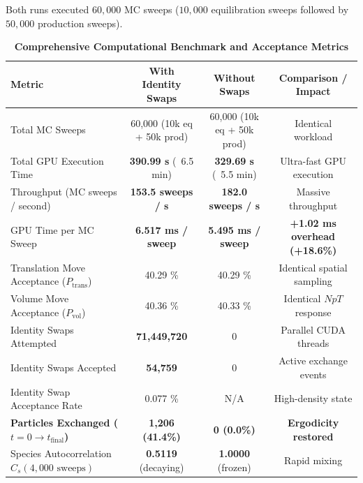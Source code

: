 \documentclass[11pt,a4paper]{article}
\begin{document}
Both runs executed $60,000$ MC sweeps ($10,000$ equilibration sweeps followed by $50,000$ production sweeps).

\begin{table}[htbp]
\centering
\small
\caption{\textbf{Comprehensive Computational Benchmark and Acceptance Metrics}}
\label{tab:benchmark_metrics}
\vspace{0.5em}
\begin{tabular*}{\textwidth}{@{\extracolsep{\fill}}lccc@{}}
\toprule
\textbf{Metric} & \textbf{With Identity Swaps} & \textbf{Without Swaps} & \textbf{Comparison / Impact} \\
\midrule
Total MC Sweeps                      & 60,000 (10k eq + 50k prod)  & 60,000 (10k eq + 50k prod)  & Identical workload \\
Total GPU Execution Time             & \textbf{390.99 s} (~6.5 min) & \textbf{329.69 s} (~5.5 min) & Ultra-fast GPU execution \\
Throughput (MC sweeps / second)      & \textbf{153.5 sweeps / s}   & \textbf{182.0 sweeps / s}   & Massive throughput \\
GPU Time per MC Sweep                & \textbf{6.517 ms / sweep}   & \textbf{5.495 ms / sweep}   & \textbf{+1.02 ms overhead (+18.6\%)} \\
Translation Move Acceptance ($P_{\text{trans}}$) & 40.29 \%        & 40.29 \%                    & Identical spatial sampling \\
Volume Move Acceptance ($P_{\text{vol}}$)        & 40.36 \%        & 40.33 \%                    & Identical $NpT$ response \\
Identity Swaps Attempted             & \textbf{71,449,720}         & 0                           & Parallel CUDA threads \\
Identity Swaps Accepted              & \textbf{54,759}             & 0                           & Active exchange events \\
Identity Swap Acceptance Rate        & 0.077 \%                    & N/A                         & High-density state \\
\midrule
\textbf{Particles Exchanged ($t=0 \to t_{\text{final}}$)} & \textbf{1,206 (41.4\%)} & \textbf{0 (0.0\%)} & \textbf{Ergodicity restored} \\
Species Autocorrelation $C_s(4,000\text{ sweeps})$ & \textbf{0.5119} (decaying) & \textbf{1.0000} (frozen) & Rapid mixing \\
\bottomrule
\end{tabular*}
\end{table}
\end{document}
